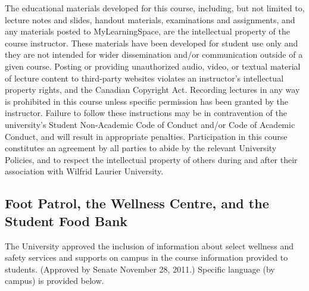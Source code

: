 \documentclass[
  letterpaper,
  DIV=11,
  numbers=noendperiod]{scrartcl}
\begin{document}
The educational materials developed for this course, including, but not
limited to, lecture notes and slides, handout materials, examinations
and assignments, and any materials posted to MyLearningSpace, are the
intellectual property of the course instructor. These materials have
been developed for student use only and they are not intended for wider
dissemination and/or communication outside of a given course. Posting or
providing unauthorized audio, video, or textual material of lecture
content to third-party websites violates an instructor's intellectual
property rights, and the Canadian Copyright Act. Recording lectures in
any way is prohibited in this course unless specific permission has been
granted by the instructor. Failure to follow these instructions may be
in contravention of the university's Student Non-Academic Code of
Conduct and/or Code of Academic Conduct, and will result in appropriate
penalties. Participation in this course constitutes an agreement by all
parties to abide by the relevant University Policies, and to respect the
intellectual property of others during and after their association with
Wilfrid Laurier University.

\hypertarget{foot-patrol-the-wellness-centre-and-the-student-food-bank}{%
\subsection{Foot Patrol, the Wellness Centre, and the Student Food
Bank}\label{foot-patrol-the-wellness-centre-and-the-student-food-bank}}

The University approved the inclusion of information about select
wellness and safety services and supports on campus in the course
information provided to students. (Approved by Senate November 28,
2011.) Specific language (by campus) is provided below.
\end{document}
